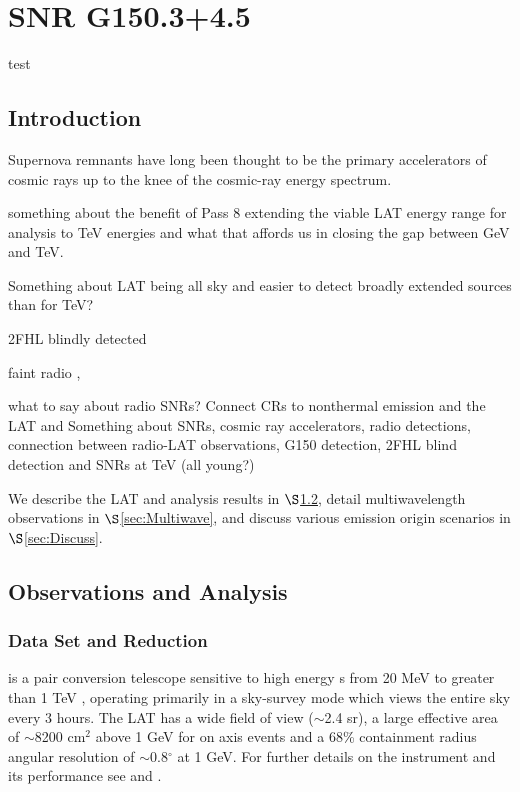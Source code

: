 \graphicspath{ {Figures/G150} } 
\chapter{SNR G150.3+4.5}
\label{chap:G150}
test
\section{Introduction} 
 Supernova remnants have long been thought to be the primary accelerators of cosmic rays up to the knee of the cosmic-ray energy spectrum. 

something about the benefit of Pass 8 extending the viable LAT energy range for analysis to TeV energies and what that affords us in closing the gap between GeV and TeV.

Something about LAT being all sky and easier to detect broadly extended sources than for TeV?

2FHL blindly detected

faint radio \citep{Gao14}, \cite{Gerbrandt14}

what to say about radio SNRs? Connect CRs to nonthermal emission and the LAT and 
Something about SNRs, cosmic ray accelerators, radio detections, connection between radio-LAT observations, G150 detection, 2FHL blind detection and SNRs at TeV (all young?)

We describe the LAT and analysis results in $\S$\ref{sec:LATobs}, detail
multiwavelength observations in $\S$\ref{sec:Multiwave}, and discuss various emission origin scenarios in $\S$\ref{sec:Discuss}.
%
%
\section{\FermiLat  Observations and  Analysis }\label{sec:LATobs}
\subsection{Data Set and Reduction}\label{sec:LATdata}
\FermiLat is a pair conversion telescope sensitive to high energy \gam{}s  from 20 MeV to greater than 1 TeV \citep{2FHL}, operating primarily in a sky-survey mode which views  the entire sky every 3 hours. The LAT has a wide field of view ($\sim$2.4 sr), a large effective area of $\sim$8200 cm$^2$ above 1 GeV for on axis events and a  68\% containment radius angular resolution  of $\sim$0.8$^\circ$  at 1 GeV. For further details  on the instrument and its performance see \cite{atwood09} and \cite{lat_perf}.

